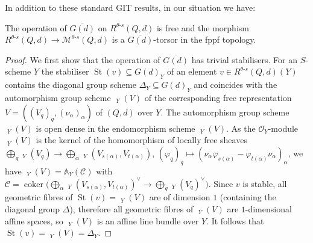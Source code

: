 \documentclass[ALCO,ThmDefs,Unicode,epreuves]{cedram}
\def\phi{\varphi}
\def\A{\mathds A}
\def\O{\mathcal O}
\DeclareMathOperator{\SHom}{{\mathscr H}\!\!\text{$om$}\,}
\DeclareMathOperator{\SEnd}{{\mathscr E}\!\text{$nd$}\,}
\DeclareMathOperator{\UEnd}{\underline{End}}
\DeclareMathOperator{\UAut}{\underline{Aut}}
\DeclareMathOperator{\coker}{coker}
\DeclareMathOperator{\St}{St}
\begin{document}
In addition to these standard GIT results, in our situation we have:

\begin{prop}\label{prop:Rs-Mtheta-torsor}
The operation of $\overline{G(d)}$ on $R^{\theta\text{-}s}(Q,d)$ is free
and the morphism
$R^{\theta\text{-}s}(Q,d)\to\mathcal M^{\theta\text{-}s}(Q,d)$ 
is a $\overline{G(d)}$-torsor in the fppf topology.
\end{prop}
\begin{proof}
We first show that the operation of $\overline{G(d)}$ has trivial stabilisers.
For an $S$-scheme $Y$ the stabiliser $\St(v)\subseteq G(d)_Y$ of an element 
$v\in R^{\theta\text{-}s}(Q,d)(Y)$ contains the diagonal group scheme 
$\Delta_Y\subseteq G(d)_Y$ and coincides with the automorphism group scheme 
$\UAut_Y(V)$ of the corresponding free representation $V=((V_q)_q,(\nu_\alpha)_\alpha)$ 
of $(Q,d)$ over $Y$.
The automorphism group scheme $\UAut_Y(V)$ is open dense in the endomorphism
scheme $\UEnd_Y(V)$. As the $\O_Y$-module $\SEnd_Y(V)$ is the kernel of 
the homomorphism of locally free sheaves
$\bigoplus_q\SEnd_Y(V_q)\to\bigoplus_\alpha\SHom_Y(V_{s(\alpha)},V_{t(\alpha)})$, 
$(\phi_q)_q\mapsto(\nu_\alpha\phi_{s(\alpha)}-\phi_{t(\alpha)}\nu_\alpha)_\alpha$,
we have $\UEnd_Y(V)=\A_Y(\mathscr C)$ with 
$\mathscr C=\coker\big(\bigoplus_\alpha\SHom_Y(V_{s(\alpha)},V_{t(\alpha)})^\vee
\!\to\bigoplus_q\SEnd_Y(V_q)^\vee\big)$.
Since $v$ is stable, all geometric fibres of $\St(v)=\UAut_Y(V)$ are of dimension $1$
(containing the diagonal group $\Delta$), therefore all geometric fibres 
of $\UEnd_Y(V)$ are $1$-dimensional affine spaces, so $\UEnd_Y(V)$ is an 
affine line bundle over $Y$.
It follows that $\St(v)=\UAut_Y(V)=\Delta_Y$.


\end{proof}
\end{document}
